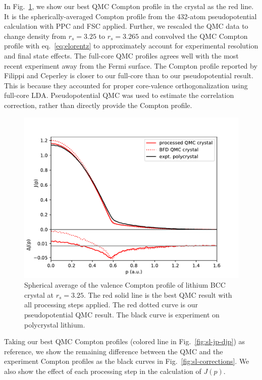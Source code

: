 \documentclass[aps,prb,showpacs,preprintnumbers,amsmath,amssymb,superscriptaddress,twocolumn]{revtex4-1}
\begin{document}
In Fig.~\ref{fig:crystal-vcp}, we show our best QMC Compton profile in the crystal as the red line. It is the spherically-averaged Compton profile from the 432-atom pseudopotential calculation with PPC and FSC applied. Further, we rescaled the QMC data to change density from $r_s=3.25$ to $r_s=3.265$ and convolved the QMC Compton profile with eq.~\ref{eq:elorentz} to approximately account for experimental resolution and final state effects. The full-core QMC profiles agrees well with the most recent experiment away from the Fermi surface.
The Compton profile reported by Filippi and Ceperley \cite{Filippi1999} is closer to our full-core than to our pseudopotential result. This is because they accounted for proper core-valence orthogonalization using full-core LDA. Pseudopotential QMC was used to estimate the correlation correction, rather than directly provide the Compton profile.

\begin{figure}
\includegraphics[width=\linewidth]{li58f_crystal-jp}
\caption{Spherical average of the valence Compton profile of lithium BCC crystal at $r_s=3.25$. The red solid line is the best QMC result with all processing steps applied. The red dotted curve is our pseudopotential QMC result. The black curve is experiment on polycrystal lithium. \label{fig:crystal-vcp}}
\end{figure}

Taking our best QMC Compton profiles (colored line in Fig.~\ref{fig:sl-jp-djp}) as reference, we show the remaining difference between the QMC and the experiment Compton profiles as the black curves in Fig.~\ref{fig:sl-corrections}. We also show the effect of each processing step in the calculation of $J(p)$. %
\end{document}
